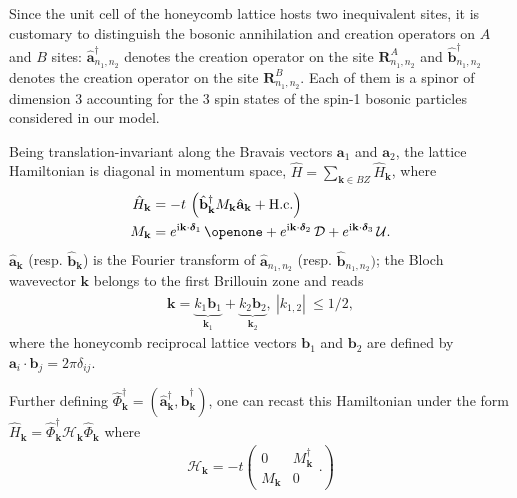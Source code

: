 \documentclass[aps,pra,showpacs,twocolumn,superscriptaddress]{revtex4-1}
\newcommand{\imag}{\mathrm{i}}
\begin{document}
Since the unit cell of the honeycomb lattice hosts two inequivalent sites, it is customary
to distinguish the bosonic annihilation and creation operators on $A$ and $B$ sites: 
$\hat{\mathbf{a}}^{\dagger}_{n_1,n_2}$ denotes the creation operator on the site $\mathbf{R}^A_{n_1,n_2}$ and 
$\hat{\mathbf{b}}^{\dagger}_{n_1,n_2}$ denotes the creation operator on the site $\mathbf{R}^B_{n_1,n_2}$.
Each of them is a spinor of dimension 3 accounting for the 3 spin states of the 
spin-1 bosonic particles considered in our model. 

Being translation-invariant along the Bravais vectors $\mathbf{a}_1$ and $\mathbf{a}_2$, the lattice Hamiltonian is diagonal in momentum space, $\hat{H} = \sum_{\mathbf{k} \in BZ} \hat{H}_{\mathbf{k}}$, where
\begin{align}
\label{eq:bloch} 
\hat{H}_{\mathbf{k}} &= -t \, \left(\hat{\mathbf{b}}^{\dagger}_{\mathbf{k}} M_{\mathbf{k}} \hat{\mathbf{a}}_{\mathbf{k}}+ \mathrm{H.c.}\right) \\
M_{\mathbf{k}} &= e^{\imag\mathbf{k}\cdot\bm{\delta}_1} \, \openone + e^{\imag\mathbf{k}\cdot\bm{\delta}_2} \, \mathcal{D}
	+ e^{\imag\mathbf{k}\cdot\bm{\delta}_3} \, \mathcal{U}.
\end{align}
$\hat{\mathbf{a}}_\mathbf{k}$ (resp. $\hat{\mathbf{b}}_\mathbf{k}$) is the Fourier transform of 
$\hat{\mathbf{a}}_{n_1,n_2}$ (resp. $\hat{\mathbf{b}}_{n_1,n_2})$; the Bloch wavevector $\mathbf{k}$ belongs to 
the first Brillouin zone and reads
\begin{align}
	\mathbf{k}=\underbrace{k_1\mathbf{b}_1}_{\mathbf{k}_1}+\underbrace{k_2\mathbf{b}_2}_{\mathbf{k}_2},\ 
	|k_{1,2}|\ \leq 1/2,
\end{align}
where the honeycomb reciprocal lattice vectors $\mathbf{b}_1$ and $\mathbf{b}_2$ are 
defined by $\mathbf{a}_i\cdot\mathbf{b}_j=2\pi\delta_{ij}$.




Further defining $\hat{\Phi}_{\mathbf{k}}^{\dagger}=(\hat{\mathbf{a}}^{\dagger}_{\mathbf{k}}, \hat{\mathbf{b}}^{\dagger}_{\mathbf{k}})$, one can recast this Hamiltonian under the form $\hat{H}_{\mathbf{k}} = \hat{\Phi}_{\mathbf{k}}^{\dagger} \mathcal{H}_{\mathbf{k}} \hat{\Phi}_{\mathbf{k}}$ where 
\begin{align}
\label{Hamil}
\mathcal{H}_{\mathbf{k}}= - t \left(
					\begin{matrix}
						0 & M_{\mathbf{k}}^{\dagger}\\
						M_{\mathbf{k}} &  0
					\end{matrix}.
				\right)
\end{align}
\end{document}
